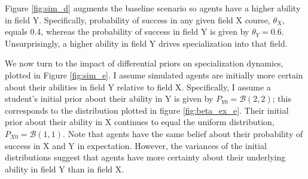 \documentclass[11 pt]{article}
\newcommand{\toedit}[1]{{\color{gray}#1}}
\newcommand{\toedit}[1]{#1}
\begin{document}



Figure \ref{fig:sim_d} augments the baseline scenario so agents have a higher ability in field Y. 
Specifically, probability of success in any given field X course, $\theta_X$, equals 0.4, whereas the probability of success in field Y is given by $\theta_Y = 0.6$. 
Unsurprisingly, a higher ability in field Y drives specialization into that field.

We now turn to the impact of differential priors on specialization dynamics, plotted in Figure \ref{fig:sim_e}.
I assume simulated agents are initially more certain about their abilities in field Y relative to field X.
Specifically, I assume a student's initial prior about their ability in Y is given by $P_{Y0} = \mathcal{B} (2, 2)$; this corresponds to the distribution plotted in figure \ref{fig:beta_ex_e}.
Their initial prior about their ability in X continues to equal the uniform distribution, $P_{X0} = \mathcal{B} (1, 1)$.
Note that agents have the same belief about their probability of success in X and Y in expectation. 
However, the variances of the initial distributions suggest that agents have more certainty about their underlying ability in field Y than in field X.
\end{document}
